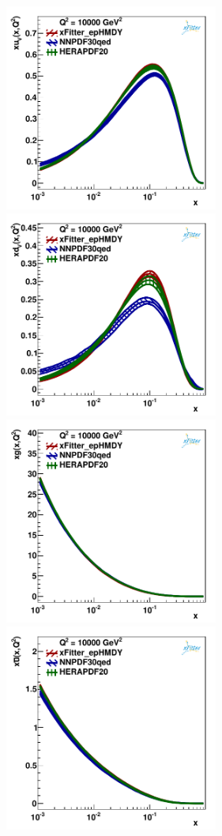 \begin{figure}
\includegraphics[width=7cm]{uv_10000.pdf} 
\includegraphics[width=7cm]{dv_10000.pdf} 
\includegraphics[width=7cm]{gluon_10000.pdf} 
\includegraphics[width=7cm]{ubar_10000.pdf} 

\end{figure}
